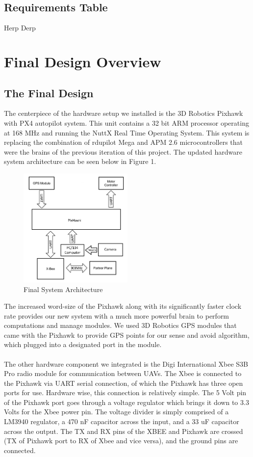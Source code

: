 \documentclass[12pt]{article}
\begin{document}
\subsection{Requirements Table}
Herp Derp

\section{Final Design Overview}
\subsection{The Final Design}
The centerpiece of the hardware setup we installed is the 3D Robotics Pixhawk with PX4 autopilot system. This unit contains a 32 bit ARM processor operating at 168 MHz and running the NuttX Real Time Operating System. This system is replacing the combination of rdupilot Mega and APM 2.6 microcontrollers that were the brains of the previous iteration of this project. The updated hardware system architecture can be seen below in Figure 1.

\begin{figure}[ht!]
   \centering
   \includegraphics[width=0.5\textwidth]{architecture.png}
   \caption{Final System Architecture}
\end{figure}

The increased word-size of the Pixhawk along with its significantly faster clock rate provides our new system with a much more powerful brain to perform computations and manage modules. We used 3D Robotics GPS modules that came with the Pixhawk to provide GPS points for our sense and avoid algorithm, which plugged into a designated port in the module.\\\\
The other hardware component we integrated is the Digi International Xbee S3B Pro radio module for communication between UAVs. The Xbee is connected to the Pixhawk via UART serial connection, of which the Pixhawk has three open ports for use. Hardware wise, this connection is relatively simple. The 5 Volt pin of the Pixhawk port goes through a voltage regulator which brings it down to 3.3 Volts for the Xbee power pin. The voltage divider is simply comprised of a LM3940 regulator, a 470 nF capacitor across the input, and a 33 uF capacitor across the output. The TX and RX pins of the XBEE and Pixhawk are crossed (TX of Pixhawk port to RX of Xbee and vice versa), and the ground pins are connected.\\\\
\end{document}
